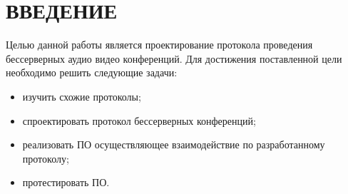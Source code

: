 \chapter*{ВВЕДЕНИЕ}

Целью данной работы является проектирование протокола проведения бессерверных аудио видео конференций.
Для достижения поставленной цели необходимо решить следующие задачи:
\begin{itemize}[label=---]
    \item изучить схожие протоколы;
    \item спроектировать протокол бессерверных конференций;
    \item реализовать ПО осуществляющее взаимодействие по разработанному протоколу;
    \item протестировать ПО.
\end{itemize}
